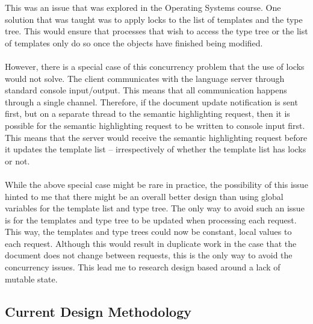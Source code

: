 \documentclass[../main.tex]{subfiles}
\begin{document}
This was an issue that was explored in the Operating Systems course. One solution that was taught was to apply locks to the list of templates and the type tree. This would ensure that processes that wish to access the type tree or the list of templates only do so once the objects have finished being modified.
\\
\\
However, there is a special case of this concurrency problem that the use of locks would not solve. The client communicates with the language server through standard console input/output. This means that all communication happens through a single channel. Therefore, if the document update notification is sent first, but on a separate thread to the semantic highlighting request, then it is possible for the semantic highlighting request to be written to console input first. This means that the server would receive the semantic highlighting request before it updates the template list -- irrespectively of whether the template list has locks or not.
\\
\\
While the above special case might be rare in practice, the possibility of this issue hinted to me that there might be an overall better design than using global variables for the template list and type tree. The only way to avoid such an issue is for the templates and type tree to be updated when processing each request. This way, the templates and type trees could now be constant, local values to each request. Although this would result in duplicate work in the case that the document does not change between requests, this is the only way to avoid the concurrency issues. This lead me to research design based around a lack of mutable state.

\subsection{Current Design Methodology}
\end{document}
